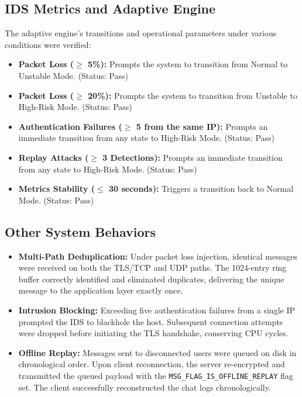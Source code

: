\documentclass[conference]{IEEEtran}
\begin{document}
\subsection{IDS Metrics and Adaptive Engine}

The adaptive engine's transitions and operational parameters under various conditions were verified:
\begin{itemize}
    \item \textbf{Packet Loss ($\ge$ 5\%):} Prompts the system to transition from Normal to Unstable Mode. (Status: Pass)
    \item \textbf{Packet Loss ($\ge$ 20\%):} Prompts the system to transition from Unstable to High-Risk Mode. (Status: Pass)
    \item \textbf{Authentication Failures ($\ge$ 5 from the same IP):} Prompts an immediate transition from any state to High-Risk Mode. (Status: Pass)
    \item \textbf{Replay Attacks ($\ge$ 3 Detections):} Prompts an immediate transition from any state to High-Risk Mode. (Status: Pass)
    \item \textbf{Metrics Stability ($\le$ 30 seconds):} Triggers a transition back to Normal Mode. (Status: Pass)
\end{itemize}

\subsection{Other System Behaviors}

\begin{itemize}
    \item \textbf{Multi-Path Deduplication:} Under packet loss injection, identical messages were received on both the TLS/TCP and UDP paths. The 1024-entry ring buffer correctly identified and eliminated duplicates, delivering the unique message to the application layer exactly once.
    \item \textbf{Intrusion Blocking:} Exceeding five authentication failures from a single IP prompted the IDS to blackhole the host. Subsequent connection attempts were dropped before initiating the TLS handshake, conserving CPU cycles.
    \item \textbf{Offline Replay:} Messages sent to disconnected users were queued on disk in chronological order. Upon client reconnection, the server re-encrypted and transmitted the queued payload with the \texttt{MSG\_FLAG\_IS\_OFFLINE\_REPLAY} flag set. The client successfully reconstructed the chat logs chronologically.
\end{itemize}
\end{document}
